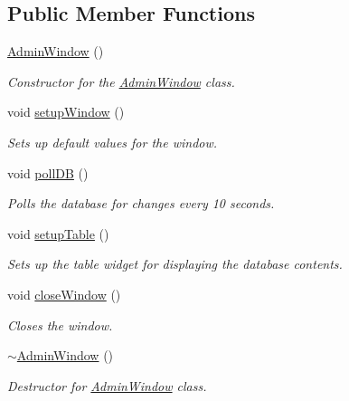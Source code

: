 \subsection*{Public Member Functions}
\begin{DoxyCompactItemize}
\item 
\mbox{\label{classAdminWindow_a5c1134335698a59ea0a9e8effeeb8280}} 
\hyperlink{classAdminWindow_a5c1134335698a59ea0a9e8effeeb8280}{Admin\+Window} ()
\begin{DoxyCompactList}\small\item\em Constructor for the \hyperlink{classAdminWindow}{Admin\+Window} class. \end{DoxyCompactList}\item 
\mbox{\label{classAdminWindow_aae08d8e2c5922acaa6c14094a1438e81}} 
void \hyperlink{classAdminWindow_aae08d8e2c5922acaa6c14094a1438e81}{setup\+Window} ()
\begin{DoxyCompactList}\small\item\em Sets up default values for the window. \end{DoxyCompactList}\item 
\mbox{\label{classAdminWindow_af5424d7dc25d7241d99843c93a2753f6}} 
void \hyperlink{classAdminWindow_af5424d7dc25d7241d99843c93a2753f6}{poll\+DB} ()
\begin{DoxyCompactList}\small\item\em Polls the database for changes every 10 seconds. \end{DoxyCompactList}\item 
\mbox{\label{classAdminWindow_a92878f8ea1bbefe1059338f19847cf15}} 
void \hyperlink{classAdminWindow_a92878f8ea1bbefe1059338f19847cf15}{setup\+Table} ()
\begin{DoxyCompactList}\small\item\em Sets up the table widget for displaying the database contents. \end{DoxyCompactList}\item 
\mbox{\label{classAdminWindow_a63e9b608e041ed1d3535483194022a4f}} 
void \hyperlink{classAdminWindow_a63e9b608e041ed1d3535483194022a4f}{close\+Window} ()
\begin{DoxyCompactList}\small\item\em Closes the window. \end{DoxyCompactList}\item 
\mbox{\label{classAdminWindow_ad31a734a759bfb65008b03e6bb9014d0}} 
\hyperlink{classAdminWindow_ad31a734a759bfb65008b03e6bb9014d0}{$\sim$\+Admin\+Window} ()
\begin{DoxyCompactList}\small\item\em Destructor for \hyperlink{classAdminWindow}{Admin\+Window} class. \end{DoxyCompactList}\end{DoxyCompactItemize}
